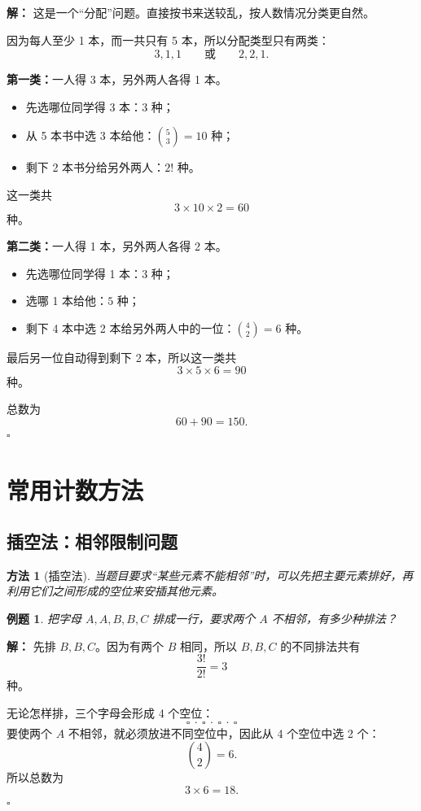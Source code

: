 \documentclass[11pt,a4paper,fontset=fandol]{ctexart}
\theoremstyle{formaltheorem}
\newtheorem{method}{方法}[section]
\theoremstyle{formalexample}
\newtheorem{example}{例题}[section]
\newenvironment{solution}{\par\noindent\textbf{解：}}{\hfill$\square$\par}
\begin{document}
\begin{solution}
这是一个“分配”问题。直接按书来送较乱，按人数情况分类更自然。

因为每人至少 1 本，而一共只有 5 本，所以分配类型只有两类：
\[
3,1,1 \qquad \text{或} \qquad 2,2,1.
\]

\textbf{第一类：}一人得 3 本，另外两人各得 1 本。
\begin{itemize}
  \item 先选哪位同学得 3 本：$3$ 种；
  \item 从 5 本书中选 3 本给他：$\binom{5}{3}=10$ 种；
  \item 剩下 2 本书分给另外两人：$2!$ 种。
\end{itemize}
这一类共
\[
3\times 10\times 2=60
\]
种。

\textbf{第二类：}一人得 1 本，另外两人各得 2 本。
\begin{itemize}
  \item 先选哪位同学得 1 本：$3$ 种；
  \item 选哪 1 本给他：$5$ 种；
  \item 剩下 4 本中选 2 本给另外两人中的一位：$\binom{4}{2}=6$ 种。
\end{itemize}
最后另一位自动得到剩下 2 本，所以这一类共
\[
3\times 5\times 6=90
\]
种。

总数为
\[
60+90=150.
\]
\end{solution}

\section{常用计数方法}

\subsection{插空法：相邻限制问题}
\begin{method}[插空法]
当题目要求“某些元素不能相邻”时，可以先把主要元素排好，再利用它们之间形成的空位来安插其他元素。
\end{method}

\begin{example}
把字母 $A,A,B,B,C$ 排成一行，要求两个 $A$ 不相邻，有多少种排法？
\end{example}

\begin{solution}
先排 $B,B,C$。因为有两个 $B$ 相同，所以 $B,B,C$ 的不同排法共有
\[
\frac{3!}{2!}=3
\]
种。

无论怎样排，三个字母会形成 4 个空位：
\[
\square\ \cdot\ \square\ \cdot\ \square\ \cdot\ \square
\]
要使两个 $A$ 不相邻，就必须放进不同空位中，因此从 4 个空位中选 2 个：
\[
\binom{4}{2}=6.
\]
所以总数为
\[
3\times 6=18.
\]
\end{solution}
\end{document}
